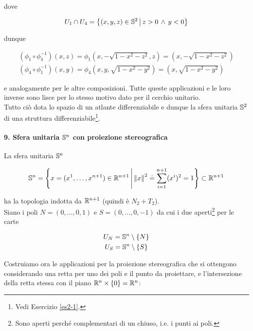 dove

\begin{equation}
	U_{1} \cap U_{4} = \left\{ (x,y,z) \in \S^{2} \st z>0 \, \wedge \, y<0 \right\}
\end{equation}

dunque

\begin{gather}
	(\phi_{1} \circ \phi_{4}^{-1})(x,z) = \phi_{1} \left( x,-\sqrt{1-x^{2}-z^{2}},z \right) = \left( x,-\sqrt{1-x^{2}-z^{2}} \right)\\
	(\phi_{4} \circ \phi_{1}^{-1})(x,y) = \phi_{4} \left( x,y,\sqrt{1-x^{2}-y^{2}} \right) = \left( x,\sqrt{1-x^{2}-y^{2}} \right)
\end{gather}

e analogamente per le altre composizioni. Tutte queste applicazioni e le loro inverse sono lisce per lo stesso motivo dato per il cerchio unitario.\\
Tutto ciò dota lo spazio di un atlante differenziabile e dunque la sfera unitaria $ \S^{2} $ di una struttura differenziabile\footnote{%
	Vedi Esercizio \ref{es2-1}.%
}.

\paragraph{9. Sfera unitaria $ \S^{n} $ con proiezione stereografica}

La sfera unitaria $ \S^{n} $

\begin{equation}
	\S^{n} = \left\{ x = (x^{1},\dots,x^{n+1}) \in \R^{n+1} \st \norm{x}^{2} \doteq \sum_{i=1}^{n+1} (x^{i})^{2} = 1 \right\} \subset \R^{n+1}
\end{equation}

ha la topologia indotta da $ \R^{n+1} $ (quindi è $ N_{2}+T_{2} $).\\
Siano i poli $ N = (0,\dots,0,1) $ e $ S = (0,\dots,0,-1) $ da cui i due aperti\footnote{%
	Sono aperti perché complementari di un chiuso, i.e. i punti ai poli.%
} per le carte

\begin{gather}
	U_{N} = \S^{n} \setminus \{N\}\\
	U_{S} = \S^{n} \setminus \{S\}
\end{gather}

Costruiamo ora le applicazioni per la proiezione stereografica che si ottengono considerando una retta per uno dei poli e il punto da proiettare, e l'intersezione della retta stessa con il piano $ \R^{n} \times \{0\} = \R^{n} $:

